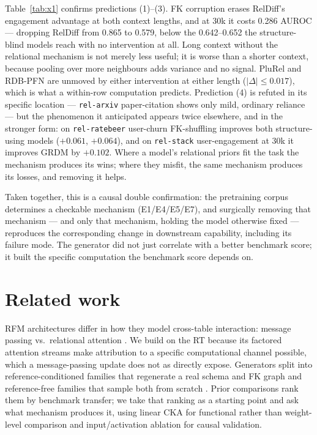 \documentclass{article}
\begin{document}
Table~\ref{tab:x1} confirms predictions (1)--(3). FK corruption erases RelDiff's engagement advantage at both context lengths, and at 30k it costs 0.286 AUROC --- dropping RelDiff from 0.865 to 0.579, below the 0.642--0.652 the structure-blind models reach with no intervention at all. Long context without the relational mechanism is not merely less useful; it is worse than a shorter context, because pooling over more neighbours adds variance and no signal. PluRel and RDB-PFN are unmoved by either intervention at either length ($|\Delta| \leq 0.017$), which is what a within-row computation predicts. Prediction (4) is refuted in its specific location --- \texttt{rel-arxiv} paper-citation shows only mild, ordinary reliance --- but the phenomenon it anticipated appears twice elsewhere, and in the stronger form: on \texttt{rel-ratebeer} user-churn FK-shuffling improves both structure-using models ($+0.061$, $+0.064$), and on \texttt{rel-stack} user-engagement at 30k it improves GRDM by $+0.102$. Where a model's relational priors fit the task the mechanism produces its wins; where they misfit, the same mechanism produces its losses, and removing it helps.

Taken together, this is a causal double confirmation: the pretraining corpus determines a checkable mechanism (E1/E4/E5/E7), and surgically removing that mechanism --- and only that mechanism, holding the model otherwise fixed --- reproduces the corresponding change in downstream capability, including its failure mode. The generator did not just correlate with a better benchmark score; it built the specific computation the benchmark score depends on.

\section{Related work}

RFM architectures differ in how they model cross-table interaction: message passing \cite{rdl,relgnn,griffin} vs.\ relational attention \cite{relgt,kumorfm,rt}. We build on the RT because its factored attention streams make attribution to a specific computational channel possible, which a message-passing update does not as directly expose. Generators split into reference-conditioned families that regenerate a real schema and FK graph \cite{reldiff,grdm} and reference-free families that sample both from scratch \cite{plurel,rdbpfn}. Prior comparisons rank them by benchmark transfer; we take that ranking as a starting point and ask what mechanism produces it, using linear CKA \cite{cka} for functional rather than weight-level comparison and input/activation ablation for causal validation.
\end{document}
